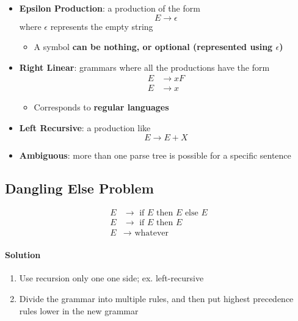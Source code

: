   \begin{itemize}
    \item \textbf{Epsilon Production}: a production of the form
    \begin{equation*}
      E \to \epsilon
    \end{equation*}
    where $ \epsilon $ represents the empty string

    \begin{itemize}
      \item A symbol \textbf{can be nothing, or optional (represented using
      $ \epsilon $)}
    \end{itemize}

    \item \textbf{Right Linear}: grammars where all the productions have the
    form
    \begin{align}
      E &\to x F \\
      E &\to x
    \end{align}

    \begin{itemize}
      \item Corresponds to \textbf{regular languages}
    \end{itemize}

    \item \textbf{Left Recursive}: a production like
    \begin{equation*}
      E \to E + X
    \end{equation*}

    \item \textbf{Ambiguous}: more than one parse tree is possible for a
    specific sentence
  \end{itemize}

  \subsection{Dangling Else Problem}

    \begin{align*}
      E &\to \text{ if } E \text{ then } E \text{ else } E \\
      E &\to \text{ if } E \text{ then } E \\
      E &\to \text{ whatever}
    \end{align*}

    \paragraph{Solution}
    \begin{enumerate}
      \item Use recursion only one one side; ex. left-recursive
      \item Divide the grammar into multiple rules, and then put highest
      precedence rules lower in the new grammar
    \end{enumerate}
